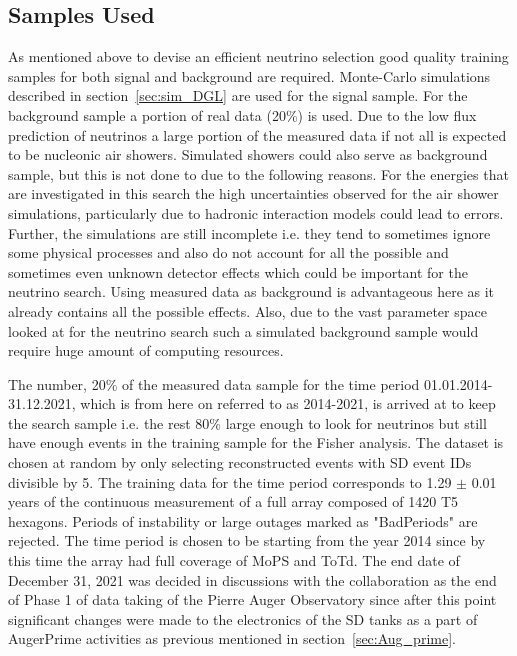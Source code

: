 \subsection{Samples Used}
\label{subsec:nu_sel_samp}
As mentioned above to devise an efficient neutrino selection good quality training samples for both signal and background are required. Monte-Carlo simulations described in section~\ref{sec:sim_DGL} are used for the signal sample. For the background sample a portion of real data (20\%) is used. Due to the low flux prediction of neutrinos a large portion of the measured data if not all is expected to be nucleonic air showers. Simulated showers could also serve as background sample, but this is not done to due to the following reasons. For the energies that are investigated in this search the high uncertainties observed for the air shower simulations, particularly due to hadronic interaction models could lead to errors. Further, the simulations are still incomplete i.e. they tend to sometimes ignore some physical processes and also do not account for all the possible and sometimes even unknown detector effects which could be important for the neutrino search. Using measured data as background is advantageous here as it already contains all the possible effects. Also, due to the vast parameter space looked at for the neutrino search such a simulated background sample would require huge amount of computing resources. 

The number, 20\% of the measured data sample for the time period 01.01.2014-31.12.2021, which is from here on referred to as 2014-2021, is arrived at to keep the search sample i.e. the rest 80\% large enough to look for neutrinos but still have enough events in the training sample for the Fisher analysis. The dataset is chosen at random by only selecting reconstructed events with SD event IDs divisible by 5. The training data for the time period corresponds to 1.29 $\pm$ 0.01 years of the continuous measurement of a full array composed of 1420 T5 hexagons. Periods of instability or large outages marked as "BadPeriods" are rejected. The time period is chosen to be starting from the year 2014 since by this time the array had full coverage of MoPS and ToTd. The end date of December 31, 2021 was decided in discussions with the collaboration as the end of Phase 1 of data taking of the Pierre Auger Observatory since after this point significant changes were made to the electronics of the SD tanks as a part of AugerPrime activities as previous mentioned in section~\ref{sec:Aug_prime}.

